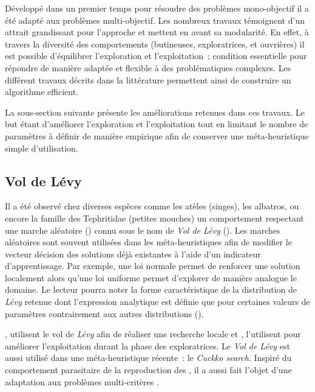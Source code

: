 Développé dans un premier temps pour résoudre des problèmes mono-objectif il a été adapté
aux problèmes multi-objectif. Les nombreux travaux témoignent d’un attrait grandissant
pour l’approche et mettent en avant sa modularité. En effet, à travers la diversité des
comportements (butineuses, exploratrices, et ouvrières) il est possible d’équilibrer
l’exploration et l’exploitation~; condition essentielle pour répondre de manière adaptée
et flexible à des problématiques complexes. Les différent travaux décrits dans la
littérature permettent ainsi de construire un algorithme efficient.

La sous-section suivante présente les améliorations retenues dans ces travaux.
Le but étant d’améliorer l’exploration et l’exploitation tout en limitant le
nombre de paramètres à définir de manière empirique afin de conserver une
méta-heuristique simple d’utilisation.



\subsection{Vol de Lévy} %
\label{sub:vol_de_levy}
Il a été observé chez diverses espèces comme les atèles (singes), les albatros,
ou encore la famille des Tephritidae (petites mouches) un comportement respectant
une marche aléatoire () connu sous le nom de
\textit{Vol de Lévy} ().
Les marches aléatoires sont souvent utilisées dans les méta-heuristiques afin de modifier
le vecteur décision des solutions déjà existantes à l’aide d’un indicateur d’apprentissage.
Par exemple, une loi normale permet de renforcer une solution localement alors qu’une loi
uniforme permet d’explorer de manière analogue le domaine. Le lecteur pourra noter la
forme caractéristique de la distribution de \textit{Lévy} retenue dont l’expression
analytique est définie que pour certaines valeurs de paramètres contrairement aux autres
distributions ().

\textcite{Sharma2012213}, utilisent le vol de \textit{Lévy} afin de réaliser une recherche locale
et \textcite{Hakli2013254}, l’utilisent pour améliorer l’exploitation durant la phase des
exploratrices. Le \textit{Vol de Lévy} est aussi utilisé dans une méta-heuristique
récente~: le \textit{Cuckko search}. Inspiré du comportement parasitaire de la
reproduction des , il a aussi
fait l’objet d’une adaptation aux problèmes multi-critères \parencite{Yang20131616}.

